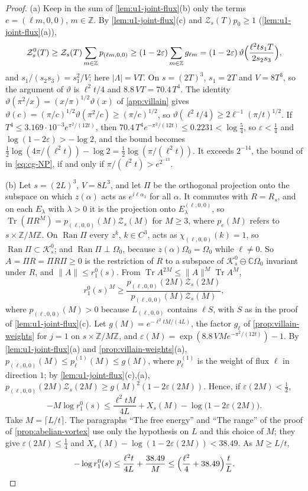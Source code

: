 \documentclass[11pt,a4paper]{amsart}
\theoremstyle{definition}
\theoremstyle{remark}
\numberwithin{equation}{section}
\DeclareMathOperator{\Tr}{Tr}        %
\newcommand{\C}{\mathbb{C}}          %
\newcommand{\Z}{\mathbb{Z}}          %
\newcommand{\Kspace}{\mathcal{K}}    %
\newcommand{\norm}[1]{\lVert #1\rVert}     %
\newcommand{\abs}[1]{\lvert #1\rvert}      %
\newcommand{\TT}{\mathbb{T}}               %
\newcommand{\Zc}{\mathcal{Z}}              %
\newcommand{\Zs}[2]{\Zc_{#1}(#2)}          %
\newcommand{\XT}[2]{X_{#1}(#2)}            %
\newcommand{\cube}[1]{(2#1)^3}             %
\newcommand{\Omegazero}{\Omega_0}          %
\newcommand{\hypN}{\text{\upshape(N)}}              %
\begin{document}
\begin{proof}
(a) Keep in the sum of \cref{lem:u1-joint-flux}\textup{(b)} only the terms $e=(\ell m,0,0)$, $m\in\Z$. By \cref{lem:u1-joint-flux}\textup{(c)} and $\Zs sTp_0\ge1$ (\cref{lem:u1-joint-flux}\textup{(a)}),
\[
\Zc^0_s(T)\ge\Zs sT\sum_{m\in\Z}p_{(\ell m,0,0)}\ge(1-2\varepsilon)\sum_{m\in\Z}g_{\ell m}=(1-2\varepsilon)\,\vartheta\Bigl(\frac{\ell^2ts_1T}{2s_2s_3}\Bigr),
\]
and $s_1/(s_2s_3)=s_1^2/V$; here $\abs\Lambda=VT$. On $s=\cube T$, $s_1=2T$ and $V=8T^3$, so the argument of $\vartheta$ is $\ell^2t/4$ and $8.8\,VT=70.4\,T^4$. The identity $\vartheta(\pi^2/x)=(x/\pi)^{1/2}\vartheta(x)$ of \cref{app:villain} gives $\vartheta(c)=(\pi/c)^{1/2}\vartheta(\pi^2/c)\ge(\pi/c)^{1/2}$, so $\vartheta(\ell^2t/4)\ge2\ell^{-1}(\pi/t)^{1/2}$. If $T^4\le3.169\cdot10^{-3}e^{\pi^2/(12t)}$, then $70.4\,T^4e^{-\pi^2/(12t)}\le0.2231<\log\frac54$, so $\varepsilon<\frac14$ and $\log(1-2\varepsilon)>-\log2$, and the bound becomes $\frac12\log(4\pi/(\ell^2t))-\log2=\frac12\log(\pi/(\ell^2t))$. It exceeds $2^{-14}$, the bound of \hypN{} in \eqref{eq:cg-NP}, if and only if $\pi/(\ell^2t)>e^{2^{-13}}$.

(b) Let $s=\cube L$, $V=8L^3$, and let $\Pi$ be the orthogonal projection onto the subspace on which $z(\alpha)$ acts as $e^{i\ell\alpha_1}$ for all $\alpha$. It commutes with $R=R_s$, and on each $E_\lambda$ with $\lambda>0$ it is the projection onto $E^{(\ell,0,0)}_\lambda$, so $\Tr(\Pi R^M)=p_{(\ell,0,0)}(M)\Zs sM$ for $M\ge3$, where $p_e(M)$ refers to $s\times\Z/M\Z$. On $\operatorname{Ran}\Pi$ every $z^k$, $k\in C^3$, acts as $\chi_{(\ell,0,0)}(k)=1$, so $\operatorname{Ran}\Pi\subset\Kspace^0_s$; and $\operatorname{Ran}\Pi\perp\Omegazero$, because $z(\alpha)\Omegazero=\Omegazero$ while $\ell\ne0$. So $A=\Pi R=\Pi R\Pi\ge0$ is the restriction of $R$ to a subspace of $\Kspace^0_s\ominus\C\Omegazero$ invariant under $R$, and $\norm A\le r_1^0(s)$. From $\Tr A^{2M}\le\norm A^M\Tr A^M$,
\[
r_1^0(s)^M\ge\frac{p_{(\ell,0,0)}(2M)\Zs s{2M}}{p_{(\ell,0,0)}(M)\Zs sM},
\]
where $p_{(\ell,0,0)}(M)>0$ because $L_{(\ell,0,0)}$ contains $\ell S$, with $S$ as in the proof of \cref{lem:u1-joint-flux}\textup{(c)}. Let $g(M)=e^{-\ell^2tM/(4L)}$, the factor $g_\ell$ of \cref{prop:villain-weights} for $j=1$ on $s\times\Z/M\Z$, and $\varepsilon(M)=\exp(8.8\,VMe^{-\pi^2/(12t)})-1$. By \cref{lem:u1-joint-flux}\textup{(a)} and \cref{prop:villain-weights}\textup{(a)}, $p_{(\ell,0,0)}(M)\le p^{(1)}_\ell(M)\le g(M)$, where $p^{(1)}_\ell$ is the weight of flux $\ell$ in direction $1$; by \cref{lem:u1-joint-flux}\textup{(c),(a)}, $p_{(\ell,0,0)}(2M)\Zs s{2M}\ge g(M)^2(1-2\varepsilon(2M))$. Hence, if $\varepsilon(2M)<\frac12$,
\[
-M\log r_1^0(s)\le\frac{\ell^2tM}{4L}+\XT sM-\log\bigl(1-2\varepsilon(2M)\bigr).
\]
Take $M=\lceil L/t\rceil$. The paragraphs ``The free energy'' and ``The range'' of the proof of \cref{prop:abelian-vortex} use only the hypothesis on $L$ and this choice of $M$; they give $\varepsilon(2M)\le\frac14$ and $\XT sM-\log(1-2\varepsilon(2M))<38.49$. As $M\ge L/t$,
\[
-\log r_1^0(s)\le\frac{\ell^2t}{4L}+\frac{38.49}M\le\Bigl(\frac{\ell^2}4+38.49\Bigr)\frac tL .
\]


\end{proof}
\end{document}
